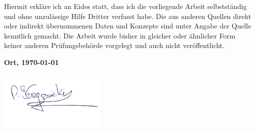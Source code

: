 \newpage

Hiermit erkläre ich an Eides statt, dass ich die vorliegende Arbeit selbstständig und ohne unzulässige Hilfe Dritter verfasst habe. Die aus anderen Quellen direkt oder indirekt übernommenen Daten und Konzepte sind unter Angabe der Quelle kenntlich gemacht. Die Arbeit wurde bisher in gleicher oder ähnlicher Form keiner anderen Prüfungsbehörde vorgelegt und auch nicht veröffentlicht.

\vspace{2cm}

\textbf{Ort, \today}

\vspace{1.5cm}

\includegraphics[width=5cm]{./picture/podpisPatryk.png} %
